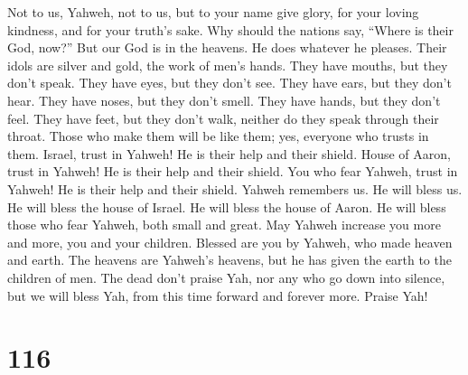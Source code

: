  Not to us, Yahweh, not to us, but to your name give
glory, for your loving kindness, and for your truth's sake.
 Why should the nations say, ``Where is their God, now?''
 But our God is in the heavens. He does whatever he
pleases.  Their idols are silver and gold, the work of
men's hands.  They have mouths, but they don't speak. They
have eyes, but they don't see.  They have ears, but they
don't hear. They have noses, but they don't smell.  They
have hands, but they don't feel. They have feet, but they don't walk,
neither do they speak through their throat.  Those who
make them will be like them; yes, everyone who trusts in them.
 Israel, trust in Yahweh! He is their help and their
shield.  House of Aaron, trust in Yahweh! He is their
help and their shield.  You who fear Yahweh, trust in
Yahweh! He is their help and their shield.  Yahweh
remembers us. He will bless us. He will bless the house of Israel. He
will bless the house of Aaron.  He will bless those who
fear Yahweh, both small and great.  May Yahweh increase
you more and more, you and your children.  Blessed are
you by Yahweh, who made heaven and earth.  The heavens
are Yahweh's heavens, but he has given the earth to the children of men.
 The dead don't praise Yah, nor any who go down into
silence,  but we will bless Yah, from this time forward
and forever more. Praise Yah!

\hypertarget{section-108}{%
\section{116}\label{section-108}}

